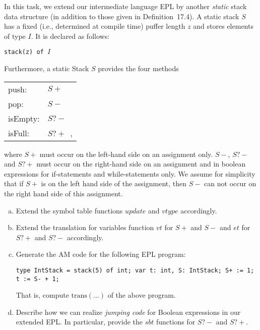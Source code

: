 \begin{exercise}{40}
  In this task, we extend our intermediate language EPL by another \emph{static} stack data structure
  (in addition to those given in Definition~17.4). 
  A static stack $S$ has a fixed (i.e., determined at compile time) puffer length $z$ and stores elements of type $I$. 
  It is declared as follows:
  \begin{center}
    \texttt{stack(z) of $I$}
  \end{center}
  Furthermore, a static Stack $S$ provides the four methods
  \begin{center}
  \begin{tabular}{ll}
    push:    & \texttt{$S+$}\\
    pop:     & \texttt{$S-$}\\
    isEmpty: & \texttt{$S?-$}\\
    isFull:  & \texttt{$S?+$}~,
  \end{tabular}
  \end{center}
  where $S+$ must occur on the left-hand side on an assignment only. $S-$, $S?-$ and $S?+$ must occur on the right-hand side on an assignment and in boolean expressions for if-statements and while-statements only. We assume for simplicity that if $S+$ is on the left hand side of the assignment, then $S-$ can not occur on the right hand side of this assignment.
  \begin{enumerate}[(a)]
    \item Extend the symbol table functions $update$ and $vtype$ accordingly.
    \item Extend the translation for variables function $vt$ for $S+$ and $S-$ and $et$ for $S?+$ and $S?-$ accordingly.
    \item Generate the AM code for the following EPL program:
      \begin{center}
        \texttt{type IntStack = stack(5) of int; var t: int, S: IntStack; S+ := 1; t := S- + 1;}
      \end{center}
      That is, compute $\mathrm{trans}(...)$ of the above program.
      \item Describe how we can realize \emph{jumping code} for Boolean expressions in our extended EPL. In particular, provide the $sbt$ functions for $S?-$ and  $S?+$.
  \end{enumerate}
\end{exercise}

